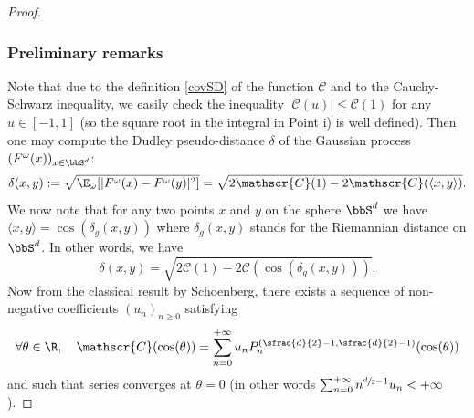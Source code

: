 \skpt
\begin{proof}\vspace*{-.5\baselineskip}
\subsubsection*{Preliminary remarks} Note that due to the definition \eqref{covSD} of the function $\mathscr{C}$ and to the Cauchy-Schwarz inequality, we easily check the inequality $|\mathscr{C}(u)|\leq \mathscr{C}(1)$ for any $u\in [-1,1]$ (so the square root in the integral in Point i) is well defined). Then one may compute the Dudley pseudo-distance $\delta$ of the Gaussian process $(F^\omega(x))_{x\in \bbS^d}$:
\begin{equation*}
\delta(x,y):=\sqrt{\E_\omega[|F^\omega(x)-F^\omega(y)|^2]}=\sqrt{2\mathscr{C}(1)-2\mathscr{C}(\langle x,y\rangle)}.
\end{equation*}
We now note that for any two points $x$ and $y$ on the sphere $\bbS^d$ we have $\langle x,y\rangle=\cos(\delta_g(x,y))$ where $\delta_g(x,y)$ stands for the Riemannian distance on $\bbS^d$.
In other words, we have
\begin{equation}\label{delt-scr}
\delta(x,y)=\sqrt{2\mathscr{C}(1)-2\mathscr{C}(\cos(\delta_g(x,y)))}.
\end{equation}
Now from the classical result \cite[p.\,101, Th.\,1]{schoenberg1942} by Schoenberg, there exists a sequence of non-negative coefficients $(u_n)_{n\geq 0}$ satisfying
\begin{equation*}
\forall \theta\in \R,\quad \mathscr{C}(\cos(\theta))=\sum_{n=0}^{+\infty} u_n
P_n^{(\sfrac{d}{2}-1,\sfrac{d}{2}-1)}(\cos(\theta))
\end{equation*}
and such that series converges at $\theta=0$ (in other words $\sum_{n=0}^{+\infty} n^{\sfrac{d}{2}-1}u_n <+\infty$).


\end{proof}
